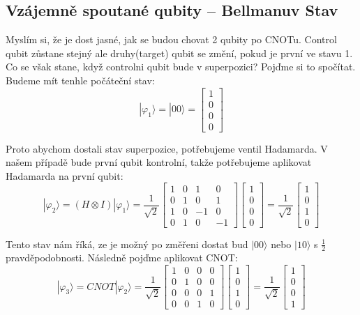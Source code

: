 \documentclass[11pt]{article}
\begin{document}
\subsection{Vzájemně spoutané qubity – Bellmanuv Stav}
Myslím si, že je dost jasné, jak se budou chovat 2 qubity po CNOTu.
Control qubit zůstane stejný ale druhy(target) qubit se změní, pokud je první ve stavu 1.
Co se však stane, když controlni qubit bude v superpozici? Pojďme si to spočítat.
Budeme mít tenhle počáteční stav:
$$|\varphi_1 \rangle = |00\rangle = \begin{bmatrix}
        1 \\
        0 \\
        0 \\
        0
    \end{bmatrix}$$
\par Proto abychom dostali stav superpozice, potřebujeme ventil Hadamarda.
V našem případě bude první qubit kontrolní, takže potřebujeme aplikovat Hadamarda na první qubit:
$$|\varphi_2 \rangle = (H \otimes I) |\varphi_1 \rangle = \frac{1}{\sqrt{2}} \begin{bmatrix}
        1 & 0 & 1  & 0  \\
        0 & 1 & 0  & 1  \\
        1 & 0 & -1 & 0  \\
        0 & 1 & 0  & -1
    \end{bmatrix}\begin{bmatrix}
        1 \\
        0 \\
        0 \\
        0
    \end{bmatrix} = \frac{1}{\sqrt{2}}\begin{bmatrix}
        1 \\
        0 \\
        1 \\
        0
    \end{bmatrix}$$
\par Tento stav nám říká, ze je možný po změřeni dostat bud $|00\rangle$ nebo $|10\rangle$ s $\frac{1}{2}$ pravděpodobnosti.
Následně pojďme aplikovat CNOT:
$$|\varphi_3 \rangle = CNOT |\varphi_2 \rangle = \frac{1}{\sqrt{2}} \begin{bmatrix}
        1 & 0 & 0 & 0 \\
        0 & 1 & 0 & 0 \\
        0 & 0 & 0 & 1 \\
        0 & 0 & 1 & 0
    \end{bmatrix}\begin{bmatrix}
        1 \\
        0 \\
        1 \\
        0
    \end{bmatrix} = \frac{1}{\sqrt{2}}\begin{bmatrix}
        1 \\
        0 \\
        0 \\
        1
    \end{bmatrix}$$
\end{document}
